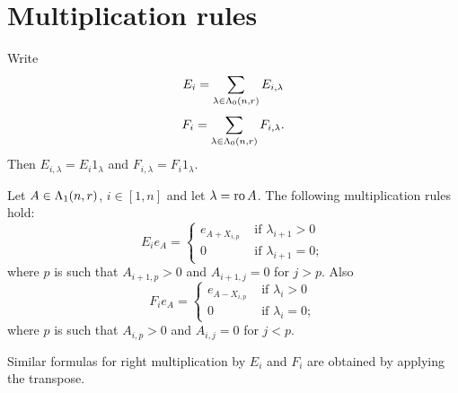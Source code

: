 \documentclass[a4paper, 11pt]{report}
\begin{document}
\section{Multiplication rules}

Write
\begin{equation*}
E_i = \sum_{\lambda\in\Lambda_0(n,r)} E_{i,\lambda}
\end{equation*}
\begin{equation*}
F_i = \sum_{\lambda\in\Lambda_0(n,r)} F_{i,\lambda}.
\end{equation*}
Then $E_{i,\lambda} = E_i 1_\lambda$ and $F_{i,\lambda} = F_i 1_\lambda$.

\begin{lemma}
Let $A\in\Lambda_1(n,r)$, $i\in [1,n]$ and let $\lambda = \operatorname{ro}{A}$. The following multiplication rules hold:
\begin{equation*}
E_i e_A = \begin{cases}
e_{A+X_{i,p}} &\text{	if } \lambda_{i+1}>0\\
0 &\text{	if } \lambda_{i+1}=0;
\end{cases}
\end{equation*}
where $p$ is such that $A_{i+1,p}>0$ and $A_{i+1,j}=0$ for $j>p$. Also
\begin{equation*}
F_i e_A = \begin{cases}
e_{A-X_{i,p}} &\text{	if } \lambda_i>0\\
0 &\text{	if } \lambda_i=0;
\end{cases}
\end{equation*}
where $p$ is such that $A_{i,p}>0$ and $A_{i,j}=0$ for $j<p$.
\end{lemma}

Similar formulas for right multiplication by $E_i$ and $F_i$ are obtained by applying the transpose.
\end{document}
